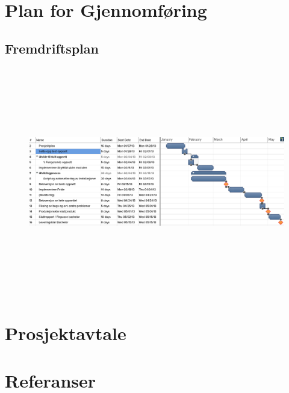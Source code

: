 \documentclass[12pt,a4paper]{article}
\begin{document}
\newpage
\section{Plan for Gjennomføring}
\subsection{Fremdriftsplan}
\begin{figure}[h]
	\includegraphics[height=100mm,width=170mm]{bachelorgantt.png}
\end{figure}

\section{Prosjektavtale}

\section{Referanser}

\newpage
\end{document}
